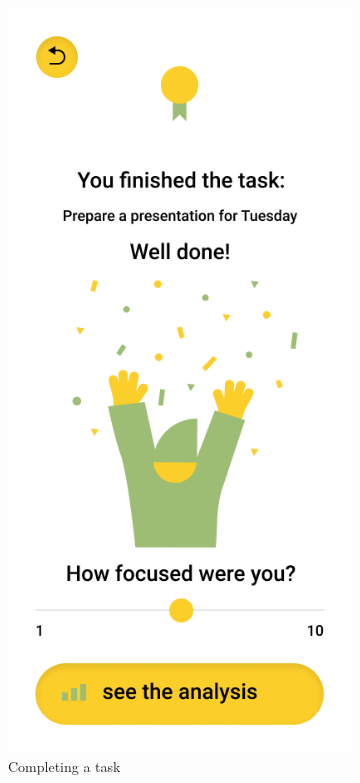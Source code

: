 \begin{figure}[htb!]
\begin{center}
\begin{subfigure}{.3\textwidth}
        \end{subfigure}%
        \begin{subfigure}{.3\textwidth}
            \centering
            \includegraphics[width=0.8\linewidth]{images/sage_finish.png}
            \caption{Completing a task}
            \label{fig:old_sage_finish}
        \end{subfigure}%
        \begin{subfigure}{.3\textwidth}
            \centering

\end{subfigure}
\end{center}
\end{figure}

